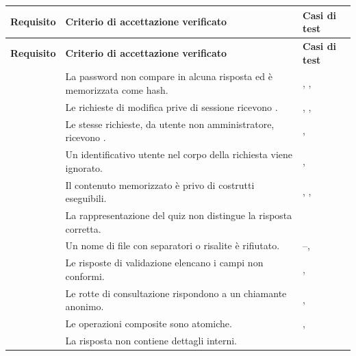 \begin{longtable}{@{}l L{6.8cm} L{4.8cm}@{}}
\toprule
\textbf{Requisito} & \textbf{Criterio di accettazione verificato} & \textbf{Casi di test} \\
\midrule
\endfirsthead
\toprule
\textbf{Requisito} & \textbf{Criterio di accettazione verificato} & \textbf{Casi di test} \\
\midrule
\endhead
\bottomrule
\endlastfoot

 &
La password non compare in alcuna risposta ed è memorizzata come hash. &
, ,  \\

 &
Le richieste di modifica prive di sessione ricevono . &
, ,  \\

 &
Le stesse richieste, da utente non amministratore, ricevono . &
,  \\

 &
Un identificativo utente nel corpo della richiesta viene ignorato. &
,  \\

 &
Il contenuto memorizzato è privo di costrutti eseguibili. &
, ,  \\

 &
La rappresentazione del quiz non distingue la risposta corretta. &
 \\

 &
Un nome di file con separatori o risalite è rifiutato. &
--,  \\
\midrule

 &
Le risposte di validazione elencano i campi non conformi. &
,  \\

 &
Le rotte di consultazione rispondono a un chiamante anonimo. &
,  \\
\midrule

 &
Le operazioni composite sono atomiche. &
,  \\

 &
La risposta  non contiene dettagli interni. &
 \\


\end{longtable}
